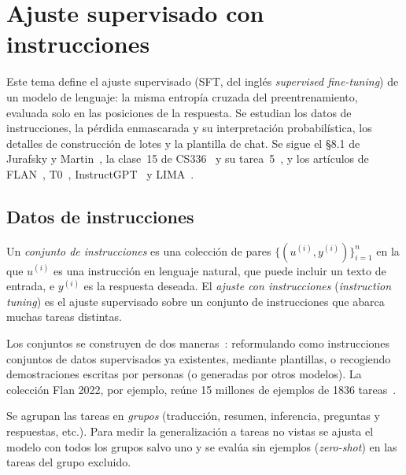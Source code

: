 \chapter{Ajuste supervisado con instrucciones}
\label{tema:2}

Este tema define el ajuste supervisado (SFT, del inglés \emph{supervised fine-tuning}) de un modelo de lenguaje: la misma entropía cruzada del preentrenamiento, evaluada solo en las posiciones de la respuesta. Se estudian los datos de instrucciones, la pérdida enmascarada y su interpretación probabilística, los detalles de construcción de lotes y la plantilla de chat. Se sigue el §8.1 de Jurafsky y Martin~\cite{jm3}, la clase~15 de CS336~\cite{cs336} y su tarea~5~\cite[§4.2]{cs336a5}, y los artículos de FLAN~\cite{wei-flan}, T0~\cite{sanh-t0}, InstructGPT~\cite[§3.2 y~§3.5]{ouyang} y LIMA~\cite{zhou-lima}.

\section{Datos de instrucciones}

\begin{definicion}\label{def:instrucciones}
Un \emph{conjunto de instrucciones} es una colección de pares $\{(u^{(i)},y^{(i)})\}_{i=1}^{n}$ en la que $u^{(i)}$ es una instrucción en lenguaje natural, que puede incluir un texto de entrada, e $y^{(i)}$ es la respuesta deseada. El \emph{ajuste con instrucciones} (\emph{instruction tuning}) es el ajuste supervisado sobre un conjunto de instrucciones que abarca muchas tareas distintas.
\end{definicion}

Los conjuntos se construyen de dos maneras~\cite[§8.1.1]{jm3}: reformulando como instrucciones conjuntos de datos supervisados ya existentes, mediante plantillas, o recogiendo demostraciones escritas por personas (o generadas por otros modelos). La colección Flan 2022, por ejemplo, reúne 15 millones de ejemplos de 1836 tareas~\cite[§8.1.1]{jm3}.

\begin{definicion}\label{def:no-vistas}
Se agrupan las tareas en \emph{grupos} (traducción, resumen, inferencia, preguntas y respuestas, etc.). Para medir la generalización a tareas no vistas se ajusta el modelo con todos los grupos salvo uno y se evalúa sin ejemplos (\emph{zero-shot}) en las tareas del grupo excluido.
\end{definicion}

